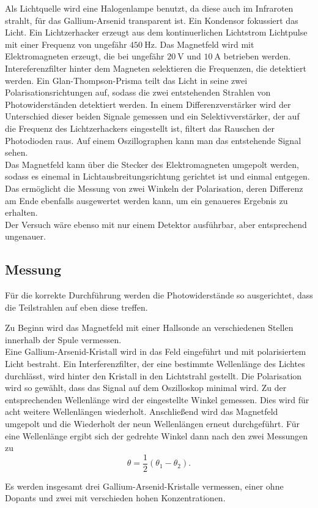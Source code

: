 Als Lichtquelle wird eine Halogenlampe benutzt, da diese auch im Infraroten strahlt, für das Gallium-Arsenid transparent ist. Ein Kondensor fokussiert das Licht. Ein Lichtzerhacker erzeugt aus dem kontinuerlichen
Lichtstrom Lichtpulse mit einer Frequenz von ungefähr $\qty{450}{\hertz}$. Das Magnetfeld wird mit Elektromagneten erzeugt, die bei ungefähr $\qty{20}{\volt}$ und $\qty{10}{\ampere}$ betrieben werden. Intereferenzfilter hinter
dem Magneten selektieren die Frequenzen, die detektiert werden. Ein Glan-Thompson-Prisma teilt das Licht in seine zwei Polarisationsrichtungen auf, sodass die zwei entstehenden Strahlen von Photowiderständen detektiert werden.
In einem Differenzverstärker wird der Unterschied dieser beiden Signale gemessen und ein Selektivverstärker, der auf die Frequenz des Lichtzerhackers eingestellt ist, filtert das Rauschen der Photodioden raus. Auf einem Oszillographen
kann man das entstehende Signal sehen. \\

Das Magnetfeld kann über die Stecker des Elektromagneten umgepolt werden, sodass es einemal in Lichtausbreitungsrichtung gerichtet ist und einmal entgegen. Das ermöglicht die Messung von zwei Winkeln der Polarisation,
deren Differenz am Ende ebenfalls ausgewertet werden kann, um ein genaueres Ergebnis zu erhalten. \\

Der Versuch wäre ebenso mit nur einem Detektor ausführbar, aber entsprechend ungenauer.\\

\subsection{Messung}

Für die korrekte Durchführung werden die Photowiderstände so ausgerichtet, dass die Teilstrahlen auf eben diese treffen. 

Zu Beginn wird das Magnetfeld mit einer Hallsonde an verschiedenen Stellen innerhalb der Spule vermessen. \\

Eine Gallium-Arsenid-Kristall wird in das Feld eingeführt und mit polarisiertem Licht bestraht. Ein Interferenzfilter, der eine bestimmte Wellenlänge des Lichtes durchlässt, wird hinter den Kristall in den Lichtstrahl gestellt.
Die Polarisation wird so gewählt, dass das Signal auf dem Oszilloskop minimal wird. Zu der entsprechenden Wellenlänge wird der eingestellte Winkel gemessen. Dies wird für acht weitere Wellenlängen wiederholt. Anschließend wird das Magnetfeld
umgepolt und die Wiederholt der neun Wellenlängen erneut durchgeführt. Für eine Wellenlänge ergibt sich der gedrehte Winkel dann nach den zwei Messungen zu
\begin{equation}
    \theta = \frac{1}{2}(\theta_1 - \theta_2).
    \label{eq:theta}
\end{equation}

Es werden insgesamt drei Gallium-Arsenid-Kristalle vermessen, einer ohne Dopants und zwei mit verschieden hohen Konzentrationen. \\


